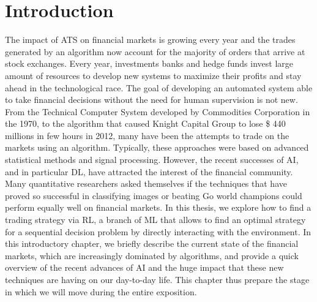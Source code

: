 \chapter{Introduction}

The impact of \gls{ATS} on financial markets is growing every year and the trades generated by an algorithm now account for the majority of orders that arrive at stock exchanges. Every year, investments banks and hedge funds invest large amount of resources to develop new systems to maximize their profits and stay ahead in the technological race. The goal of developing an automated system able to take financial decisions without the need for human supervision is not new. From the Technical Computer System developed by Commodities Corporation in the 1970, to the algorithm that caused Knight Capital Group to lose \$ 440 millions in few hours in 2012, many have been the attempts to trade on the markets using an algorithm. Typically, these approaches were based on advanced statistical methods and signal processing. However, the recent successes of \gls{AI}, and in particular \gls{DL}, have attracted the interest of the financial community. Many quantitative researchers asked themselves if the techniques that have proved so successful in classifying images or beating Go world champions could perform equally well on financial markets. In this thesis, we explore how to find a trading strategy via \gls{RL}, a branch of \gls{ML} that allows to find an optimal strategy for a sequential decision problem by directly interacting with the environment. In this introductory chapter, we briefly describe the current state of the financial markets, which are increasingly dominated by algorithms, and provide a quick overview of the recent advances of \gls{AI} and the huge impact that these new techniques are having on our day-to-day life. This chapter thus prepare the stage in which we will move during the entire exposition. 

